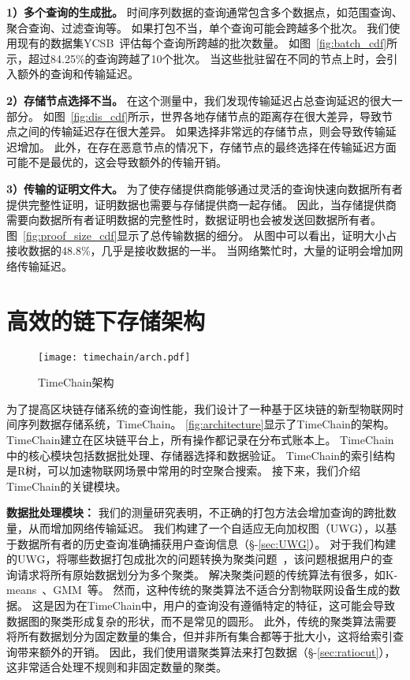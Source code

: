 \textbf{1）多个查询的生成批。}
时间序列数据的查询通常包含多个数据点，如范围查询、聚合查询、过滤查询等。
如果打包不当，单个查询可能会跨越多个批次。
我们使用现有的数据集YCSB~\cite{barata2014ycsb}评估每个查询所跨越的批次数量。
如图~\autoref{fig:batch_cdf}所示，超过84.25\%的查询跨越了10个批次。
当这些批驻留在不同的节点上时，会引入额外的查询和传输延迟。

\textbf{2）存储节点选择不当。}
在这个测量中，我们发现传输延迟占总查询延迟的很大一部分。
如图~\autoref{fig:dis_cdf}所示，世界各地存储节点的距离存在很大差异，导致节点之间的传输延迟存在很大差异。
如果选择非常远的存储节点，则会导致传输延迟增加。
此外，在存在恶意节点的情况下，存储节点的最终选择在传输延迟方面可能不是最优的，这会导致额外的传输开销。

\textbf{3）传输的证明文件大。}
为了使存储提供商能够通过灵活的查询快速向数据所有者提供完整性证明，证明数据也需要与存储提供商一起存储。
因此，当存储提供商需要向数据所有者证明数据的完整性时，数据证明也会被发送回数据所有者。
图~\autoref{fig:proof_size_cdf}显示了总传输数据的细分。
从图中可以看出，证明大小占接收数据的48.8\%，几乎是接收数据的一半。
当网络繁忙时，大量的证明会增加网络传输延迟。

\section{高效的链下存储架构}
\label{sec:design}

\begin{figure}[t]
    \centering
    \texttt{[image: timechain/arch.pdf]}
    \caption{TimeChain架构}
    \label{fig:architecture}
\end{figure}

为了提高区块链存储系统的查询性能，我们设计了一种基于区块链的新型物联网时间序列数据存储系统，TimeChain。
\autoref{fig:architecture}显示了TimeChain的架构。
TimeChain建立在区块链平台上，所有操作都记录在分布式账本上。
TimeChain中的核心模块包括数据批处理、存储器选择和数据验证。
TimeChain的索引结构是R树，可以加速物联网场景中常用的时空聚合搜索。
接下来，我们介绍TimeChain的关键模块。

\textbf{数据批处理模块：}
我们的测量研究表明，不正确的打包方法会增加查询的跨批数量，从而增加网络传输延迟。
我们构建了一个自适应无向加权图（UWG），以基于数据所有者的历史查询准确捕获用户查询信息（§-\ref{sec:UWG}）。
对于我们构建的UWG，将哪些数据打包成批次的问题转换为聚类问题~\cite{xu2005survey}，该问题根据用户的查询请求将所有原始数据划分为多个聚类。
解决聚类问题的传统算法有很多，如K-means~\cite{kanungo2002efficient}、GMM~\cite{he2010laplacian}等。
然而，这种传统的聚类算法不适合分割物联网设备生成的数据。
这是因为在TimeChain中，用户的查询没有遵循特定的特征，这可能会导致数据图的聚类形成复杂的形状，而不是常见的圆形。
此外，传统的聚类算法需要将所有数据划分为固定数量的集合，但并非所有集合都等于批大小，这将给索引查询带来额外的开销。
因此，我们使用谱聚类算法来打包数据（§-\ref{sec:ratiocut}），这非常适合处理不规则和非固定数量的聚类。

